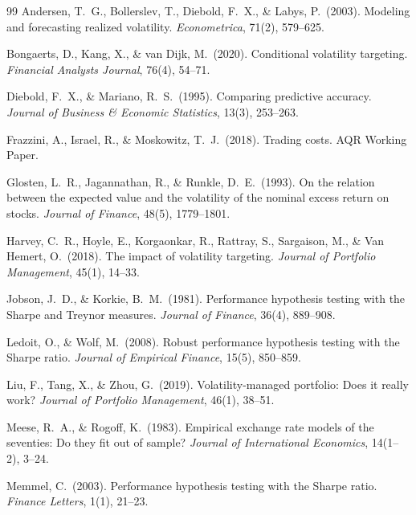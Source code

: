\documentclass[12pt, a4paper]{article}
\begin{document}
\begin{thebibliography}{99}
Andersen, T.\ G., Bollerslev, T., Diebold, F.\ X., \& Labys, P.\ (2003).
Modeling and forecasting realized volatility. \textit{Econometrica}, 71(2), 579--625.

Bongaerts, D., Kang, X., \& van Dijk, M.\ (2020).
Conditional volatility targeting. \textit{Financial Analysts Journal}, 76(4), 54--71.

Diebold, F.\ X., \& Mariano, R.\ S.\ (1995). Comparing predictive accuracy.
\textit{Journal of Business \& Economic Statistics}, 13(3), 253--263.

Frazzini, A., Israel, R., \& Moskowitz, T.\ J.\ (2018). Trading costs. AQR Working Paper.

Glosten, L.\ R., Jagannathan, R., \& Runkle, D.\ E.\ (1993). On the relation between the
expected value and the volatility of the nominal excess return on stocks.
\textit{Journal of Finance}, 48(5), 1779--1801.

Harvey, C.\ R., Hoyle, E., Korgaonkar, R., Rattray, S., Sargaison, M., \& Van Hemert, O.\ (2018).
The impact of volatility targeting. \textit{Journal of Portfolio Management}, 45(1), 14--33.

Jobson, J.\ D., \& Korkie, B.\ M.\ (1981). Performance hypothesis testing with the Sharpe
and Treynor measures. \textit{Journal of Finance}, 36(4), 889--908.

Ledoit, O., \& Wolf, M.\ (2008). Robust performance hypothesis testing with the Sharpe ratio.
\textit{Journal of Empirical Finance}, 15(5), 850--859.

Liu, F., Tang, X., \& Zhou, G.\ (2019). Volatility-managed portfolio: Does it really work?
\textit{Journal of Portfolio Management}, 46(1), 38--51.

Meese, R.\ A., \& Rogoff, K.\ (1983). Empirical exchange rate models of the seventies:
Do they fit out of sample? \textit{Journal of International Economics}, 14(1--2), 3--24.

Memmel, C.\ (2003). Performance hypothesis testing with the Sharpe ratio.
\textit{Finance Letters}, 1(1), 21--23.


\end{thebibliography}
\end{document}

